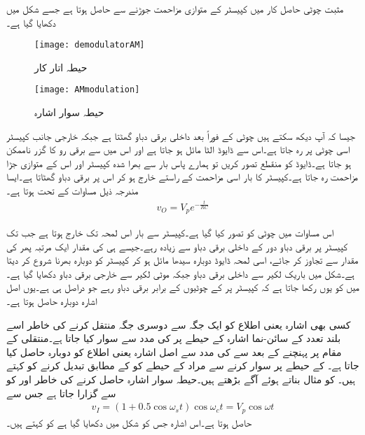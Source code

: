 مثبت چوٹی حاصل کار میں کپیسٹر کے متوازی مزاحمت جوڑنے سے   حاصل ہوتا ہے جسے شکل   میں دکھایا گیا ہے۔
\begin{figure}
\centering
\texttt{[image: demodulatorAM]}
\caption{حیطہ اتار کار}
\label{شکل_حیطہ_اتر_کار}
\end{figure}
%
\begin{figure}
\centering
\texttt{[image: AMmodulation]}
\caption{حیطہ سوار اشارہ}
\label{شکل_حیطہ_سوار_اشارہ}
\end{figure}
جیسا کہ آپ دیکھ سکتے ہیں چوٹی  کے  فوراً بعد داخلی برقی دباو گھٹتا ہے جبکہ خارجی جانب کپیسٹر اسی چوٹی پر رہ جاتا ہے۔اس سے ڈایوڈ الٹا مائل ہو جاتا ہے اور اس میں سے برقی رو کا گزر ناممکن ہو جاتا ہے۔ڈایوڈ کو منقطع تصور کریں تو ہمارے پاس بار سے بھرا شدہ کپیسٹر   اور اس کے متوازی جڑا مزاحمت  رہ جاتا ہے۔کپیسٹر کا بار اسی مزاحمت کے راستے  خارج ہو کر اس پر برقی دباو گھٹاتا ہے۔ایسا مندرجہ ذیل مساوات کے تحت ہوتا ہے۔
\begin{align} \label{مساوات_حیطہ_اتار_کار_الف}
v_O=V_{p} e^{-\frac{t}{RC}}
\end{align}

اس مساوات میں چوٹی کو  تصور کیا گیا ہے۔کپیسٹر سے بار اس لمحہ تک خارج ہوتا ہے جب تک کپیسٹر پر برقی دباو   دور کے داخلی برقی دباو   سے زیادہ رہے۔جیسے ہی کی مقدار ایک مرتبہ پھر کی مقدار سے تجاوز کر جائے، اسی لمحہ ڈایوڈ دوبارہ سیدھا مائل ہو کر کپیسٹر کو دوبارہ بھرنا شروع کر دیتا ہے۔شکل میں باریک لکیر سے داخلی برقی دباو جبکہ موٹی لکیر سے خارجی برقی دباو دکھایا گیا ہے۔ میں  کو یوں رکھا جاتا ہے کہ  کپیسٹر پر  کے چوٹیوں کے برابر برقی دباو رہے جو دراصل  ہی ہے۔یوں اصل اشارہ دوبارہ حاصل ہوتا ہے۔

کسی بھی اشارہ یعنی اطلاع   کو ایک جگہ سے دوسری جگہ منتقل کرنے کی خاطر اسے بلند تعدد کے سائن-نما اشارہ  کے حیطے پر  کی مدد سے سوار کیا جاتا ہے۔منتقلی کے مقام پر پہنچنے کے بعد  سے  کی مدد سے اصل اشارہ یعنی اطلاع کو  دوبارہ حاصل کیا جاتا ہے۔ کے حیطے پر سوار کرنے سے مراد  کے حیطے کو  کے مطابق تبدیل کرنے کو کہتے ہیں۔ کو مثال بناتے ہوئے آگے بڑھتے ہیں۔حیطہ سوار اشارہ حاصل کرنے کی خاطر  اور  کو  سے گزارا جاتا ہے جس سے 
\begin{align}\label{مساوات_ڈایوڈ_حیطہ_سوار_اشارہ}
v_I=\left(1+0.5 \cos \omega_s t \right) \cos \omega_c t=V_p \cos \omega t
\end{align}
حاصل ہوتا ہے۔اس اشارہ جس کو شکل  میں دکھایا گیا ہے کو   کہتے ہیں۔

